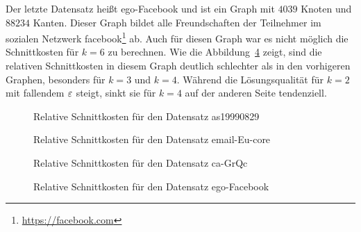 Der letzte Datensatz heißt ego-Facebook und ist ein Graph mit $4039$ Knoten und $88234$ Kanten.
Dieser Graph bildet alle Freundschaften der Teilnehmer im sozialen Netzwerk facebook\footnote{\url{https://facebook.com}} ab.
Auch für diesen Graph war es nicht möglich die Schnittkosten für $k=6$ zu berechnen.
Wie die Abbildung~\ref{fig:facebook} zeigt, sind die relativen Schnittkosten in diesem Graph deutlich schlechter als in den vorhigeren Graphen, besonders für $k=3$ und $k=4$.
Während die Lösungsqualität für $k=2$ mit fallendem $\varepsilon$ steigt, sinkt sie für $k=4$ auf der anderen Seite tendenziell.

\begin{figure}[t]
    \centering
    
    \caption{Relative Schnittkosten für den Datensatz as19990829\label{fig:as}}
\end{figure}


\begin{figure}
    \centering
    
    \caption{Relative Schnittkosten für den Datensatz email-Eu-core\label{fig:email}}
\end{figure}

\begin{figure}
    \centering
    
    \caption{Relative Schnittkosten für den Datensatz ca-GrQc\label{fig:cagrqc}}
\end{figure}

\begin{figure}
    \centering
    
    \caption{Relative Schnittkosten für den Datensatz ego-Facebook\label{fig:facebook}}
\end{figure}

